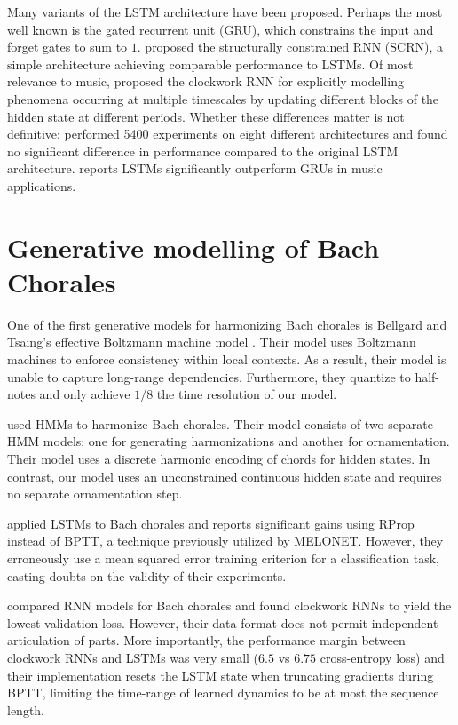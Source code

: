 \documentclass[dissertation.tex]{subfiles}
\begin{document}
Many variants of the LSTM architecture have been proposed. Perhaps the most
well known is the gated recurrent unit (GRU)\cite{cho2014learning}, which
constrains the input and forget gates to sum to $1$. \cite{Mikolov2015}
proposed the structurally constrained RNN (SCRN), a simple architecture
achieving comparable performance to LSTMs. Of most relevance to music,
\cite{Koutnik2014} proposed the clockwork RNN for explicitly modelling phenomena
occurring at multiple timescales by updating different blocks of the hidden
state at different periods. Whether these differences matter is not definitive:
\cite{greff2015lstm} performed 5400 experiments on eight different
architectures and found no significant difference in performance compared to
the original LSTM architecture. \cite{Nayebi2015} reports LSTMs significantly
outperform GRUs in music applications.

\section{Generative modelling of Bach Chorales}

One of the first generative models for harmonizing Bach chorales is Bellgard
and Tsaing's effective Boltzmann machine model \cite{bellgard1994harmonizing}. Their model
uses Boltzmann machines to enforce consistency within local contexts. As a result,
their model is unable to capture long-range dependencies. Furthermore, they quantize
to half-notes and only achieve $1/8$ the time resolution of our model.

\cite{Allan2005} used HMMs to harmonize Bach chorales. Their model consists of
two separate HMM models: one for generating harmonizations and another for
ornamentation. Their model uses a discrete harmonic encoding of chords for
hidden states. In contrast, our model uses an unconstrained continuous hidden
state and requires no separate ornamentation step.

\cite{Liu2014} applied LSTMs to Bach chorales and reports significant gains
using RProp instead of BPTT, a technique previously utilized by
MELONET\cite{feulner1994melonet}. However, they erroneously use a mean squared
error training criterion for a classification task, casting doubts on the
validity of their experiments.

\cite{Brien2016} compared RNN models for Bach chorales and found clockwork RNNs to
yield the lowest validation loss. However, their data format does not permit
independent articulation of parts. More importantly, the performance margin between
clockwork RNNs and LSTMs was very small ($6.5$ vs $6.75$ cross-entropy loss) and their
implementation resets the LSTM state when truncating gradients during BPTT, limiting the
time-range of learned dynamics to be at most the sequence length.


\printbibliography
\end{document}
